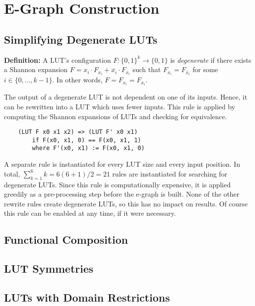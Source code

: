 \section{E-Graph Construction} \label{sec:rewrites}

\subsection{Simplifying Degenerate LUTs} \label{sec:rewrites:degen}

\textbf{Definition:} A LUT's configuration $F : \{ 0, 1 \}^k \rightarrow \{ 0, 1 \}$ is \textit{degenerate} if there exists a Shannon expansion $F = x_i \cdot F_{x_i} + \overline{x_i} \cdot F_{\overline{x}_i}$
such that $F_{x_i} = F_{\overline{x}_i}$ for some $i \in \{ 0, \ldots, k -1\}$. In other words, $F = F_{x_i} = F_{\overline{x}_i}$.

The output of a degenerate LUT is not dependent on one of its inputs. Hence, it
can be rewritten into a LUT which uses fewer inputs. This rule is applied by
computing the Shannon expansions of LUTs and checking for equivalence.

\begin{verbatim}
    (LUT F x0 x1 x2) => (LUT F' x0 x1)
        if F(x0, x1, 0) == F(x0, x1, 1)
        where F'(x0, x1) := F(x0, x1, 0)
\end{verbatim}

A separate rule is instantiated for every LUT size and every input position. In
total, $\sum_{k=1}^{6} k = 6(6+1)/2 = 21$ rules are instantiated for searching
for degenerate LUTs. Since this rule is computationally expensive, it is
applied greedily as a pre-processing step before the e-graph is built. None of
the other rewrite rules create degenerate LUTs, so this has no impact on
results. Of course this rule can be enabled at any time, if it were necessary.

\subsection{Functional Composition}  \label{sec:rewrites:composition}

\subsection{LUT Symmetries} \label{sec:rewrites:symmetry}

\subsection{LUTs with Domain Restrictions} \label{sec:rewrites:restrict}

